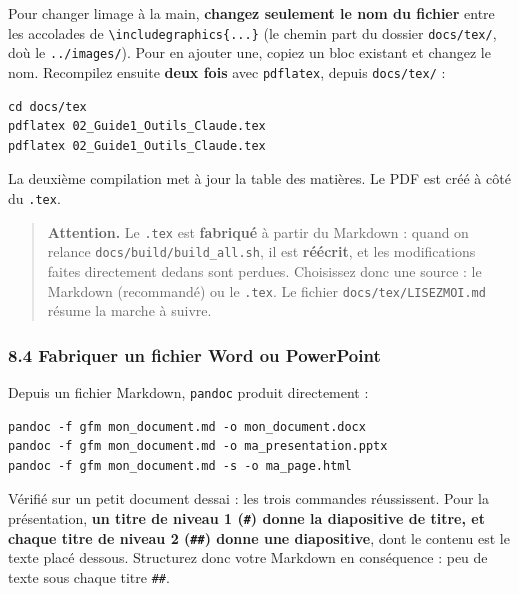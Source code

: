 \documentclass[
  french,
  11pt,
  a4paper,
]{article}
\begin{document}
Pour changer l\textquotesingle image à la main, \textbf{changez
seulement le nom du fichier} entre les accolades de
\texttt{\textbackslash{}includegraphics\{...\}} (le chemin part du
dossier \texttt{docs/tex/}, d\textquotesingle où le
\texttt{../images/}). Pour en ajouter une, copiez un bloc existant et
changez le nom. Recompilez ensuite \textbf{deux fois} avec
\texttt{pdflatex}, depuis \texttt{docs/tex/} :

\begin{Verbatim}[breaklines=true,breakanywhere=true,fontsize=\small,frame=leftline,framerule=1.6pt,rulecolor=\color{credixblue},framesep=3mm,xleftmargin=2mm,xrightmargin=1mm]
cd docs/tex
pdflatex 02_Guide1_Outils_Claude.tex
pdflatex 02_Guide1_Outils_Claude.tex
\end{Verbatim}

La deuxième compilation met à jour la table des matières. Le PDF est
créé à côté du \texttt{.tex}.

\begin{quote}
\textbf{Attention.} Le \texttt{.tex} est \textbf{fabriqué} à partir du
Markdown : quand on relance
\texttt{docs/\allowbreak{}build/\allowbreak{}build\_\allowbreak{}all.\allowbreak{}sh},
il est \textbf{réécrit}, et les modifications faites directement dedans
sont perdues. Choisissez donc une source : le Markdown (recommandé) ou
le \texttt{.tex}. Le fichier
\texttt{docs/\allowbreak{}tex/\allowbreak{}LISEZMOI.\allowbreak{}md}
résume la marche à suivre.
\end{quote}

\subsubsection{8.4 Fabriquer un fichier Word ou
PowerPoint}\label{84-fabriquer-un-fichier-word-ou-powerpoint}

Depuis un fichier Markdown, \texttt{pandoc} produit directement :

\begin{Verbatim}[breaklines=true,breakanywhere=true,fontsize=\small,frame=leftline,framerule=1.6pt,rulecolor=\color{credixblue},framesep=3mm,xleftmargin=2mm,xrightmargin=1mm]
pandoc -f gfm mon_document.md -o mon_document.docx
pandoc -f gfm mon_document.md -o ma_presentation.pptx
pandoc -f gfm mon_document.md -s -o ma_page.html
\end{Verbatim}

Vérifié sur un petit document d\textquotesingle essai : les trois
commandes réussissent. Pour la présentation, \textbf{un titre de niveau
1 (\texttt{\#}) donne la diapositive de titre, et chaque titre de niveau
2 (\texttt{\#\#}) donne une diapositive}, dont le contenu est le texte
placé dessous. Structurez donc votre Markdown en conséquence : peu de
texte sous chaque titre \texttt{\#\#}.
\end{document}
